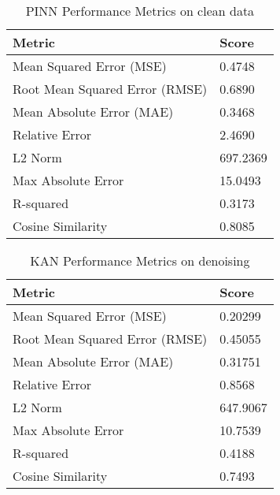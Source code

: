 \documentclass[conference]{IEEEtran}
\begin{document}
\begin{table}[h!]
\centering
\begin{tabular}{|l|l|}
\hline
\textbf{Metric}                  & \textbf{Score}                     \\ \hline
Mean Squared Error (MSE)          & 0.4748                              \\ \hline
Root Mean Squared Error (RMSE)    & 0.6890                              \\ \hline
Mean Absolute Error (MAE)         & 0.3468                              \\ \hline
Relative Error                    & 2.4690                              \\ \hline
L2 Norm                           & 697.2369                            \\ \hline
Max Absolute Error                & 15.0493                             \\ \hline
R-squared                         & 0.3173                              \\ \hline
Cosine Similarity                 & 0.8085                              \\ \hline
\end{tabular}
\vspace{5pt} %
\caption{PINN Performance Metrics on clean data}
\end{table}

\begin{table}[h!]
\centering
\begin{tabular}{|l|l|}
\hline
\textbf{Metric}                  & \textbf{Score}                     \\ \hline
Mean Squared Error (MSE)          & 0.20299                             \\ \hline
Root Mean Squared Error (RMSE)    & 0.45055                             \\ \hline
Mean Absolute Error (MAE)         & 0.31751                             \\ \hline
Relative Error                    & 0.8568                              \\ \hline
L2 Norm                           & 647.9067                           \\ \hline
Max Absolute Error                & 10.7539                             \\ \hline
R-squared                         & 0.4188                              \\ \hline
Cosine Similarity                 & 0.7493                              \\ \hline
\end{tabular}
\vspace{5pt} %
\caption{KAN Performance Metrics on denoising}
\end{table}
\end{document}
